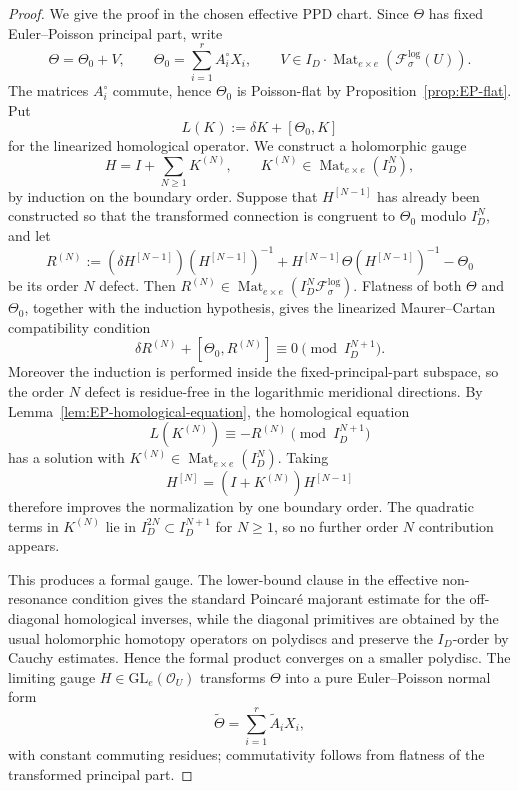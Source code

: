 \documentclass[10pt,a4paper]{amsart}
\newcommand{\GL}{\mathrm{GL}}
\DeclareMathOperator{\Mat}{Mat}
\newcommand{\OO}{\mathcal{O}}
\newcommand{\fol}{\mathcal{F}}
\begin{document}
\begin{proof}
We give the proof in the chosen effective PPD chart.  Since \(\Theta\) has fixed Euler--Poisson principal part, write
\[
\Theta=\Theta_0+V,
\qquad
\Theta_0=\sum_{i=1}^r A_i^\circ X_i,
\qquad
V\in I_D\cdot\Mat_{e\times e}(\fol_\sigma^{\log}(U)).
\]
The matrices \(A_i^\circ\) commute, hence \(\Theta_0\) is Poisson-flat by Proposition~\ref{prop:EP-flat}.  Put
\[
L(K):=\delta K+[\Theta_0,K]
\]
for the linearized homological operator.
We construct a holomorphic gauge
\[
H=I+\sum_{N\ge1}K^{(N)},
\qquad K^{(N)}\in\Mat_{e\times e}(I_D^N),
\]
by induction on the boundary order.  Suppose that \(H^{[N-1]}\) has already been constructed so that the
transformed connection is congruent to \(\Theta_0\) modulo \(I_D^N\), and let
\[
R^{(N)}:=(\delta H^{[N-1]})(H^{[N-1]})^{-1}
       +H^{[N-1]}\Theta(H^{[N-1]})^{-1}-\Theta_0
\]
be its order \(N\) defect.  Then
\(R^{(N)}\in\Mat_{e\times e}(I_D^N\fol_\sigma^{\log})\).  Flatness of both \(\Theta\) and \(\Theta_0\), together
with the induction hypothesis, gives the linearized Maurer--Cartan compatibility condition
\[
        \delta R^{(N)}+[\Theta_0,R^{(N)}]\equiv0
        \pmod {I_D^{N+1}}.
\]
Moreover the induction is performed inside the fixed-principal-part subspace, so the order \(N\) defect is
residue-free in the logarithmic meridional directions.
By Lemma~\ref{lem:EP-homological-equation}, the homological equation
\[
        L(K^{(N)})\equiv -R^{(N)}\pmod{I_D^{N+1}}
\]
has a solution with \(K^{(N)}\in\Mat_{e\times e}(I_D^N)\).  Taking
\[
H^{[N]}=(I+K^{(N)})H^{[N-1]}
\]
therefore improves the normalization by one boundary order.  The quadratic terms in \(K^{(N)}\) lie in
\(I_D^{2N}\subset I_D^{N+1}\) for \(N\ge1\), so no further order \(N\) contribution appears.

This produces a formal gauge.  The lower-bound clause in the effective non-resonance condition gives the
standard Poincar\'e majorant estimate for the off-diagonal homological inverses, while the diagonal primitives
are obtained by the usual holomorphic homotopy operators on polydiscs and preserve the \(I_D\)-order by
Cauchy estimates.  Hence the formal product converges on a smaller polydisc.  The limiting gauge
\(H\in\GL_e(\OO_U)\) transforms \(\Theta\) into a pure Euler--Poisson normal form
\[
        \widetilde\Theta=\sum_{i=1}^r\widetilde A_iX_i,
\]
with constant commuting residues; commutativity follows from flatness of the transformed principal part.
\end{proof}
\end{document}

